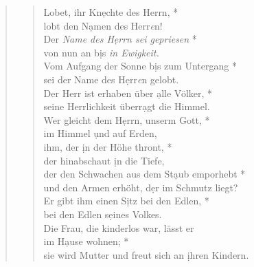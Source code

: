 \begin{quote}

\begin{verse}
Lobet, ihr Kn\d echte des Herrn, *\\
lobt den N\d amen des Herr\textit{e}n!\\ 
\vin Der \textit{ Name des H\d errn sei gepriesen} *\\ 
\vin von nun an b\d is \textit{in Ewigkeit.}\\
Vom Aufgang der Sonne b\d is zum Untergang *\\
sei der Name des H\d err{\textit{e}}n gelobt.\\ 
\vin Der Herr ist erhaben über \d alle Völker, *\\ 
\vin seine Herrlichkeit überr\d agt die Himmel.\\ 
Wer gleicht dem H\d errn, unserm Gott, *\\
im Himmel \d und auf Erden,\\ 
\vin ihm, der \d in der Höhe thront, *\\ 
\vin der hinabschaut \d in die Tiefe, \\
der den Schwachen aus dem St\d aub emporhebt *\\
und den Armen erhöht, d\d er im Schmutz liegt?\\ 
\vin Er gibt ihm einen S\d itz bei den Edlen, *\\ 
\vin bei den Edlen s\d eines Volkes.\\ 
Die Frau, die kinderlos war, lässt er\\
im H\d ause wohnen; *\\
sie wird Mutter und freut sich an \d ihren Kindern.\\ 

\end{verse}
\end{quote}

\vspace{0.3cm}


\def\greinitialformat#1{{\fontsize{40}{40}\selectfont #1}}
\gresetfirstlineaboveinitial{\small \textcolor{red}{Ps 114}}{}
\setaboveinitialseparation{0.72mm}

\vspace{0.3cm}




